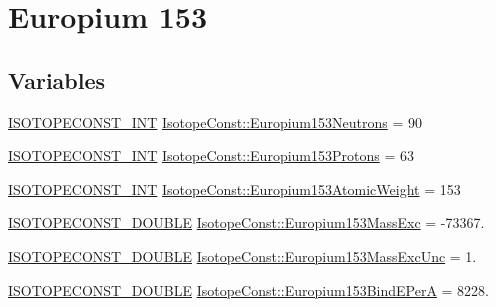\hypertarget{group___isotope_const-_europium-_eu153}{}\section{Europium 153}
\label{group___isotope_const-_europium-_eu153}
\subsection*{Variables}
\begin{DoxyCompactItemize}
\item 
\mbox{\hyperlink{group___isotope_const-_macros_ga5f18360b3e99483a35c32d789e62621c}{I\+S\+O\+T\+O\+P\+E\+C\+O\+N\+S\+T\+\_\+\+I\+NT}} \mbox{\hyperlink{group___isotope_const-_europium-_eu153_gab2777ac886947e18bf65927205ee6157}{Isotope\+Const\+::\+Europium153\+Neutrons}} = 90
\item 
\mbox{\hyperlink{group___isotope_const-_macros_ga5f18360b3e99483a35c32d789e62621c}{I\+S\+O\+T\+O\+P\+E\+C\+O\+N\+S\+T\+\_\+\+I\+NT}} \mbox{\hyperlink{group___isotope_const-_europium-_eu153_gaa0b7fd86c3a70caeea8f8a64313a5225}{Isotope\+Const\+::\+Europium153\+Protons}} = 63
\item 
\mbox{\hyperlink{group___isotope_const-_macros_ga5f18360b3e99483a35c32d789e62621c}{I\+S\+O\+T\+O\+P\+E\+C\+O\+N\+S\+T\+\_\+\+I\+NT}} \mbox{\hyperlink{group___isotope_const-_europium-_eu153_ga053ccff1f9054ba50c2621331ce7424f}{Isotope\+Const\+::\+Europium153\+Atomic\+Weight}} = 153
\item 
\mbox{\hyperlink{group___isotope_const-_macros_ga8f45a7272ce02c0b4c65c44636ed719a}{I\+S\+O\+T\+O\+P\+E\+C\+O\+N\+S\+T\+\_\+\+D\+O\+U\+B\+LE}} \mbox{\hyperlink{group___isotope_const-_europium-_eu153_ga03f2a419b79b1267980b04074b31ca1f}{Isotope\+Const\+::\+Europium153\+Mass\+Exc}} = -\/73367.
\item 
\mbox{\hyperlink{group___isotope_const-_macros_ga8f45a7272ce02c0b4c65c44636ed719a}{I\+S\+O\+T\+O\+P\+E\+C\+O\+N\+S\+T\+\_\+\+D\+O\+U\+B\+LE}} \mbox{\hyperlink{group___isotope_const-_europium-_eu153_ga12d2d0f47d97241c25dd2b8fbe4172d6}{Isotope\+Const\+::\+Europium153\+Mass\+Exc\+Unc}} = 1.
\item 
\mbox{\hyperlink{group___isotope_const-_macros_ga8f45a7272ce02c0b4c65c44636ed719a}{I\+S\+O\+T\+O\+P\+E\+C\+O\+N\+S\+T\+\_\+\+D\+O\+U\+B\+LE}} \mbox{\hyperlink{group___isotope_const-_europium-_eu153_gae691d20ae214b8b41c8ce46b52458095}{Isotope\+Const\+::\+Europium153\+Bind\+E\+PerA}} = 8228.
\item 

\end{DoxyCompactItemize}
